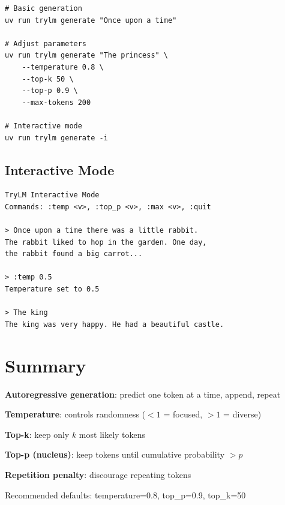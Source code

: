 \begin{lstlisting}[style=shell]
# Basic generation
uv run trylm generate "Once upon a time"

# Adjust parameters
uv run trylm generate "The princess" \
    --temperature 0.8 \
    --top-k 50 \
    --top-p 0.9 \
    --max-tokens 200

# Interactive mode
uv run trylm generate -i
\end{lstlisting}

\subsection{Interactive Mode}

\begin{lstlisting}[style=shell, numbers=none]
TryLM Interactive Mode
Commands: :temp <v>, :top_p <v>, :max <v>, :quit

> Once upon a time there was a little rabbit.
The rabbit liked to hop in the garden. One day,
the rabbit found a big carrot...

> :temp 0.5
Temperature set to 0.5

> The king
The king was very happy. He had a beautiful castle.
\end{lstlisting}

\section{Summary}

\begin{summary}
    \item \textbf{Autoregressive generation}: predict one token at a time, append, repeat
    \item \textbf{Temperature}: controls randomness ($<1$ = focused, $>1$ = diverse)
    \item \textbf{Top-k}: keep only $k$ most likely tokens
    \item \textbf{Top-p (nucleus)}: keep tokens until cumulative probability $> p$
    \item \textbf{Repetition penalty}: discourage repeating tokens
    \item Recommended defaults: temperature=0.8, top\_p=0.9, top\_k=50
\end{summary}
